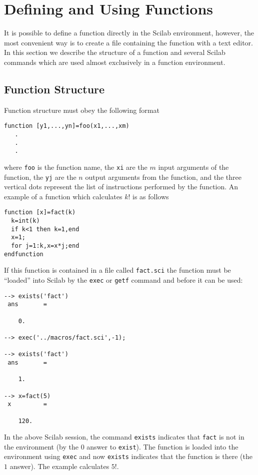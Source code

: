 \section{Defining and Using Functions}
\label{s4.2}

	It is possible to define a function directly in
the Scilab environment, however, the most convenient way
is to create a file containing the function
with a text editor.  In this section we describe the
structure of a function and several Scilab commands which are
used almost exclusively in a function environment.

\subsection{Function Structure}
Function structure must obey the following format
\begin{verbatim}
function [y1,...,yn]=foo(x1,...,xm)
   .
   .
   .
\end{verbatim}
where {\tt foo} is the function name, the {\tt xi} are the $m$ input arguments
of the function,  the {\tt yj} are the $n$ output arguments from the function, and
the three vertical dots represent the list of instructions performed by
the function.  An example of a function
which calculates $k!$ is as follows
\begin{verbatim}
function [x]=fact(k)
  k=int(k)
  if k<1 then k=1,end
  x=1;
  for j=1:k,x=x*j;end
endfunction
\end{verbatim}
If this function is contained in a file called {\tt fact.sci} the function
must be ``loaded'' into  Scilab by the {\tt exec} or {\tt getf} command and before
it can be used:
\begin{verbatim}
--> exists('fact')
 ans       =
 
    0.  
 
--> exec('../macros/fact.sci',-1);
 
--> exists('fact')
 ans       =
 
    1.  
 
--> x=fact(5)
 x         =
 
    120.  
\end{verbatim}
In the above Scilab session, the command 
{\tt exists} 
indicates that
{\tt fact} is not in the environment (by the $0$ answer to {\tt exist}).  The
function is loaded into the environment using {\tt exec} and now {\tt exists}
indicates that the function is there (the $1$ answer).  The example 
calculates $5!$. 

